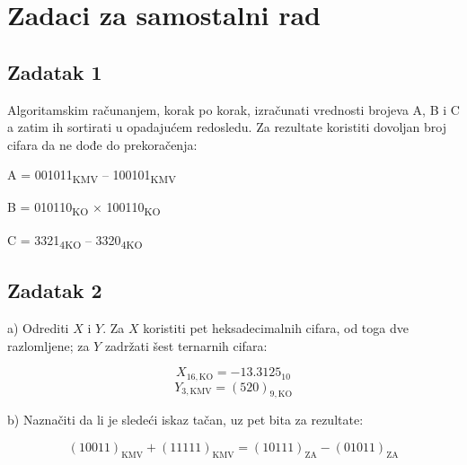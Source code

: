 \documentclass[a4paper,11pt]{article}
\numberwithin{equation}{section}
\begin{document}
\FloatBarrier
\clearpage
\section{Zadaci za samostalni rad}\label{sec:3}


\FloatBarrier
\subsection{Zadatak 1}\label{sec:3.1}


Algoritamskim računanjem, korak po korak, izračunati vrednosti brojeva A, B i C a zatim ih sortirati u opadajućem redosledu. Za rezultate koristiti dovoljan broj cifara da ne dođe do prekoračenja:



A = 001011\textsubscript{KMV} – 100101\textsubscript{KMV}



B = 010110\textsubscript{KO} \ensuremath{\times} 100110\textsubscript{KO}



C = 3321\textsubscript{4KO} – 3320\textsubscript{4KO}



\FloatBarrier
\subsection{Zadatak 2}\label{sec:3.2}


a) Odrediti $X$ i $Y$. Za $X$ koristiti pet heksadecimalnih cifara, od toga dve razlomljene; za $Y$ zadržati šest ternarnih cifara:

\begin{equation}\label{eq:racun-10}
X_{16,\mathrm{KO}}=-13.3125_{10}
\end{equation}
\begin{equation}\label{eq:racun-11}
Y_{3,\mathrm{KMV}}=(520)_{9,\mathrm{KO}}
\end{equation}


b) Naznačiti da li je sledeći iskaz tačan, uz pet bita za rezultate:

\begin{equation}\label{eq:racun-12}
(10011)_{\mathrm{KMV}}+(11111)_{\mathrm{KMV}}=(10111)_{\mathrm{ZA}}-(01011)_{\mathrm{ZA}}
\end{equation}
\end{document}
